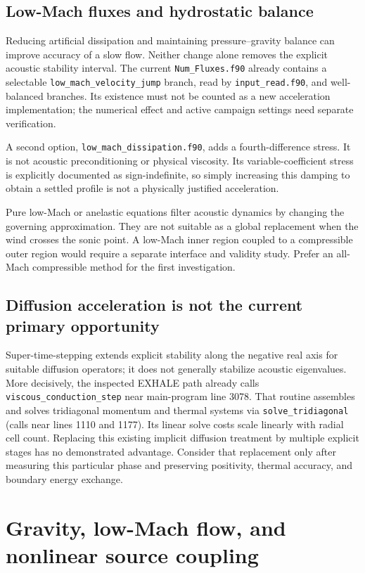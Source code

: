 \documentclass[english,a4paper]{my_memo}
\newcommand{\code}[1]{\nolinkurl{#1}}
\begin{document}
\subsection{Low-Mach fluxes and hydrostatic balance}
Reducing artificial dissipation and maintaining pressure--gravity balance can improve accuracy of a slow flow. Neither change alone removes the explicit acoustic stability interval. The current \code{Num_Fluxes.f90} already contains a selectable \code{low_mach_velocity_jump} branch, read by \code{input_read.f90}, and well-balanced branches. Its existence must not be counted as a new acceleration implementation; the numerical effect and active campaign settings need separate verification.

A second option, \code{low_mach_dissipation.f90}, adds a fourth-difference stress. It is not acoustic preconditioning or physical viscosity. Its variable-coefficient stress is explicitly documented as sign-indefinite, so simply increasing this damping to obtain a settled profile is not a physically justified acceleration. 

Pure low-Mach or anelastic equations filter acoustic dynamics by changing the governing approximation. They are not suitable as a global replacement when the wind crosses the sonic point. A low-Mach inner region coupled to a compressible outer region would require a separate interface and validity study. Prefer an all-Mach compressible method for the first investigation.

\subsection{Diffusion acceleration is not the current primary opportunity}
Super-time-stepping extends explicit stability along the negative real axis for suitable diffusion operators; it does not generally stabilize acoustic eigenvalues. More decisively, the inspected EXHALE path already calls \code{viscous_conduction_step} near main-program line 3078. That routine assembles and solves tridiagonal momentum and thermal systems via \code{solve_tridiagonal} (calls near lines 1110 and 1177). Its linear solve costs scale linearly with radial cell count. Replacing this existing implicit diffusion treatment by multiple explicit stages has no demonstrated advantage. Consider that replacement only after measuring this particular phase and preserving positivity, thermal accuracy, and boundary energy exchange.

\section{Gravity, low-Mach flow, and nonlinear source coupling}
\end{document}
